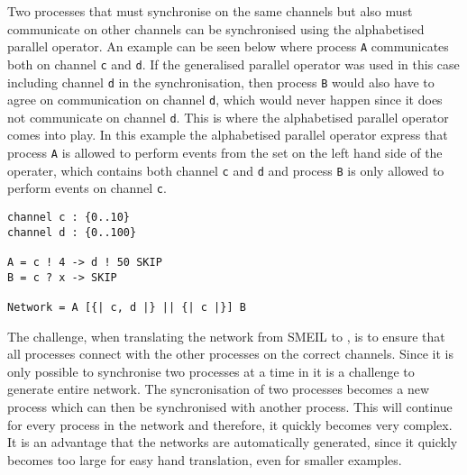 Two processes that must synchronise on the same channels but also must communicate on other channels can be synchronised using the alphabetised parallel operator. An example can be seen below where process \texttt{A} communicates both on channel \texttt{c} and \texttt{d}. If the generalised parallel operator was used in this case including channel \texttt{d} in the synchronisation, then process \texttt{B} would also have to agree on communication on channel \texttt{d}, which would never happen since it does not communicate on channel \texttt{d}. This is where the alphabetised parallel operator comes into play. In this example the alphabetised parallel operator express that process \texttt{A} is allowed to perform events from the set on the left hand side of the operater, which contains both channel \texttt{c} and \texttt{d} and process \texttt{B} is only allowed to perform events on channel \texttt{c}.
\begin{verbatim}
channel c : {0..10}
channel d : {0..100}

A = c ! 4 -> d ! 50 SKIP
B = c ? x -> SKIP

Network = A [{| c, d |} || {| c |}] B
\end{verbatim}

The challenge, when translating the network from SMEIL to \cspm{}, is to ensure that all processes connect with the other processes on the correct channels.
Since it is only possible to synchronise two processes at a time in \cspm{} it is a challenge to generate entire network. The syncronisation of two processes becomes a new process which can then be synchronised with another process. This will continue for every process in the network and therefore, it quickly becomes very complex. It is an advantage that the \cspm{} networks are automatically generated, since it quickly becomes too large for easy hand translation, even for smaller examples.

